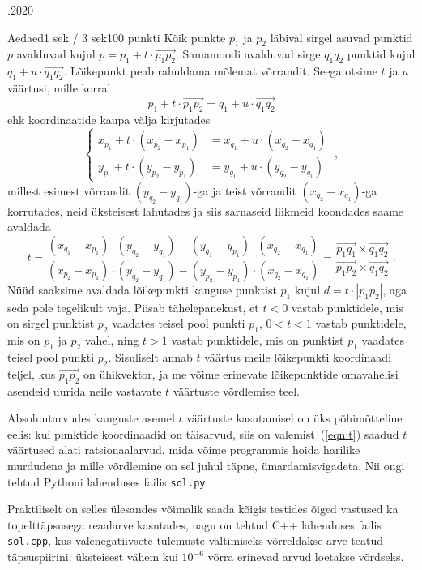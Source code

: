 \documentclass[a4paper,11pt]{article}
\begin{document}
\begin{ol}{\eio}{.2020}{\lah}{}
\begin{yl}{1}{Aed}{aed}{1 sek / 3 sek}{100 punkti}
Kõik punkte $p_1$ ja $p_2$ läbival sirgel asuvad punktid $p$ avalduvad kujul $p = p_1 + t \cdot \vec{p_1 p_2}$. Samamoodi avalduvad sirge $q_1 q_2$ punktid kujul $q_1 + u \cdot \vec{q_1 q_2}$. Lõikepunkt peab rahuldama mõlemat võrrandit. Seega otsime $t$ ja $u$ väärtusi, mille korral
  \[
    p_1 + t \cdot \vec{p_1 p_2} = q_1 + u \cdot \vec{q_1 q_2}
  \]
ehk koordinaatide kaupa välja kirjutades
  \[
    \left\{
    \begin{aligned}
      x_{p_1} + t \cdot (x_{p_2} - x_{p_1}) &= x_{q_1} + u \cdot (x_{q_2} - x_{q_1}) \\
      y_{p_1} + t \cdot (y_{p_2} - y_{p_1}) &= y_{q_1} + u \cdot (y_{q_2} - y_{q_1})
    \end{aligned}
    \right. \; ,
  \]
millest esimest võrrandit $(y_{q_2} - y_{q_1})$-ga ja teist võrrandit $(x_{q_2} - x_{q_1})$-ga korrutades, neid üksteisest lahutades ja siis sarnaseid liikmeid koondades saame avaldada
  \begin{equation} \label{eqn:t}
    t = \frac{(x_{q_1} - x_{p_1}) \cdot (y_{q_2} - y_{q_1}) - (y_{q_1} - y_{p_1}) \cdot (x_{q_2} - x_{q_1})}
            {(x_{p_2} - x_{p_1}) \cdot (y_{q_2} - y_{q_1}) - (y_{p_2} - y_{p_1}) \cdot (x_{q_2} - x_{q_1})}
      = \frac{\vec{p_1 q_1} \times \vec{q_1 q_2}}{\vec{p_1 p_2} \times \vec{q_1 q_2}} \; .
  \end{equation}
Nüüd saaksime avaldada lõikepunkti kauguse punktist $p_1$ kujul $d = t \cdot |p_1 p_2|$, aga seda pole tegelikult vaja. Piisab tähelepanekust, et $t < 0$ vastab punktidele, mis on sirgel punktist $p_2$ vaadates teisel pool punkti $p_1$, $0 < t < 1$ vastab punktidele, mis on $p_1$ ja $p_2$ vahel, ning $t > 1$ vastab punktidele, mis on punktist $p_1$ vaadates teisel pool punkti $p_2$. Sisuliselt annab $t$ väärtus meile lõikepunkti koordinaadi teljel, kus $\vec{p_1 p_2}$ on ühikvektor, ja me võime erinevate lõikepunktide omavahelisi asendeid uurida neile vastavate $t$ väärtuste võrdlemise teel.

Absoluutarvudes kauguste asemel $t$ väärtuste kasutamisel on üks põhimõtteline eelis: kui punktide koordinaadid on täisarvud, siis on valemist~(\ref{eqn:t}) saadud $t$ väärtused alati ratsionaalarvud, mida võime programmis hoida harilike murdudena ja mille võrdlemine on sel juhul täpne, ümardamisvigadeta. Nii ongi tehtud Pythoni lahenduses failis \verb'sol.py'.

Praktiliselt on selles ülesandes võimalik saada kõigis testides õiged vastused ka topelttäpsusega reaalarve kasutades, nagu on tehtud C++ lahenduses failis \verb'sol.cpp', kus valenegatiivsete tulemuste vältimiseks võrreldakse arve teatud täpsuspiirini: üksteisest vähem kui $10^{-6}$ võrra erinevad arvud loetakse võrdseks.


\end{yl}
\end{ol}
\end{document}
